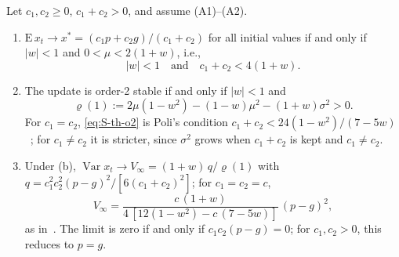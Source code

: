 \begin{thS}
\label{prop:S-pso-stability}
Let $c_1,c_2\ge0$, $c_1+c_2>0$, and assume (A1)--(A2).
\begin{enumerate}
\item[(a)] $\mathrm E\,x_t\to x^*=(c_1p+c_2g)/(c_1+c_2)$ for all initial values if and only if $\lvert w\rvert<1$ and $0<\mu<2(1+w)$, i.e.,
\begin{equation}
\lvert w\rvert<1\quad\text{and}\quad c_1+c_2<4(1+w).
\label{eq:S-th-o1}
\end{equation}
\item[(b)] The update is order-2 stable if and only if $\lvert w\rvert<1$ and
\begin{equation}
\varrho(1):=2\mu(1-w^2)-(1-w)\mu^2-(1+w)\sigma^2>0 .
\label{eq:S-th-o2}
\end{equation}
For $c_1=c_2$, \eqref{eq:S-th-o2} is Poli's condition $c_1+c_2<24(1-w^2)/(7-5w)$~\cite{Poli2009}; for $c_1\ne c_2$ it is stricter, since $\sigma^2$ grows when $c_1+c_2$ is kept and $c_1\ne c_2$.
\item[(c)] Under (b), $\operatorname{Var}x_t\to V_\infty=(1+w)\,q/\varrho(1)$ with $q=c_1^2c_2^2(p-g)^2/[6(c_1+c_2)^2]$; for $c_1=c_2=c$,
\begin{equation}
V_\infty=\frac{c\,(1+w)}{4\,[12(1-w^2)-c\,(7-5w)]}\,(p-g)^2 ,
\label{eq:S-th-vinf}
\end{equation}
as in~\cite{Poli2009}. The limit is zero if and only if $c_1c_2(p-g)=0$; for $c_1,c_2>0$, this reduces to $p=g$.
\end{enumerate}
\end{thS}

